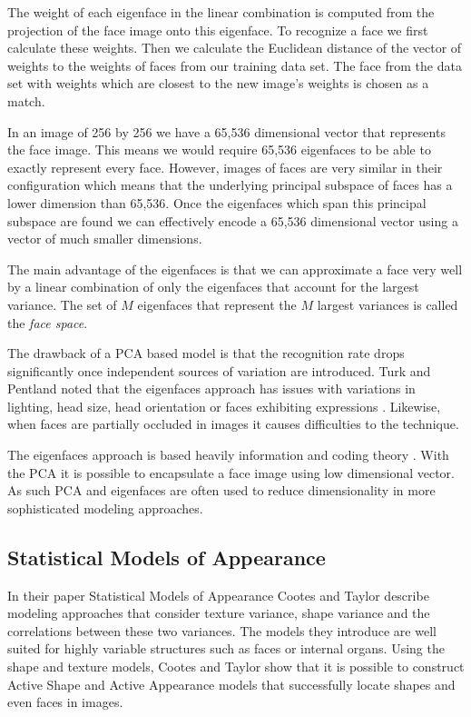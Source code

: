 \documentclass[11pt,a4paper]{report}
\begin{document}
The weight of each eigenface in the linear combination is computed from the
projection of the face image onto this eigenface. To recognize a face we
 first calculate these weights. Then we calculate the Euclidean distance of the vector
of weights to the weights of faces from our training data set. The face from
the data set with weights which are closest to the new image's weights is chosen
as a match.

In an image of 256 by 256 we have a 65,536 dimensional vector that
represents the face image. This means we would require 65,536 eigenfaces to be
able to exactly represent every face. However, images of faces are very similar
in their configuration which means that the underlying principal subspace of
faces has a lower dimension than 65,536. Once the eigenfaces which span this
principal subspace are found we can
effectively encode a 65,536 dimensional vector using a vector of much smaller
dimensions. 

The main advantage of the eigenfaces is that we can approximate a face very well
by a linear combination of only the eigenfaces that account for the largest
variance. The set of $M$ eigenfaces that represent the $M$ largest variances is called
the \textit{face space}.

The drawback of a PCA based model is that the recognition rate drops significantly once
independent sources of variation are introduced. Turk and
Pentland noted that the eigenfaces approach has issues with variations in lighting,
head size, head orientation or faces exhibiting expressions \cite{eigenfaces91}. Likewise, when
faces are partially occluded in images it causes difficulties to the technique. 

The eigenfaces approach is based heavily information and coding theory
\cite{eigenfaces91}. With the PCA it is possible to encapsulate a face image
using low dimensional vector. As such PCA and eigenfaces are often used to
reduce dimensionality in more sophisticated modeling approaches.


\subsection{Statistical Models of Appearance}
In their paper Statistical Models of Appearance \cite{activeApp04} Cootes and Taylor
describe modeling approaches that consider texture variance, shape variance and the
correlations between these two variances. The models they introduce are well suited for highly
variable structures such as faces or internal organs. Using the shape and
texture models, Cootes and Taylor show that it is possible to construct Active
Shape and Active Appearance models that successfully locate
shapes and even faces in images.
\end{document}
